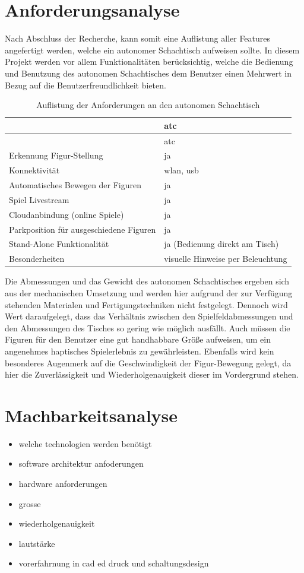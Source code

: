 \hypertarget{anforderungsanalyse}{%
\chapter{Anforderungsanalyse}\label{anforderungsanalyse}}

Nach Abschluss der Recherche, kann somit eine Auflistung aller Features
angefertigt werden, welche ein autonomer Schachtisch aufweisen sollte.
In diesem Projekt werden vor allem Funktionalitäten berücksichtig,
welche die Bedienung und Benutzung des autonomen Schachtisches dem
Benutzer einen Mehrwert in Bezug auf die Benutzerfreundlichkeit bieten.

\begin{longtable}[]{@{}ll@{}}
\caption{Auflistung der Anforderungen an den autonomen
Schachtisch}\tabularnewline
\toprule
& \gls{atc}\tabularnewline
\midrule
\endfirsthead
\toprule
& \gls{atc}\tabularnewline
\midrule
\endhead
Erkennung Figur-Stellung & ja\tabularnewline
Konnektivität & \gls{wlan}, \gls{usb}\tabularnewline
Automatisches Bewegen der Figuren & ja\tabularnewline
Spiel Livestream & ja\tabularnewline
Cloudanbindung (online Spiele) & ja\tabularnewline
Parkposition für ausgeschiedene Figuren & ja\tabularnewline
Stand-Alone Funktionalität & ja (Bedienung direkt am
Tisch)\tabularnewline
Besonderheiten & visuelle Hinweise per Beleuchtung\tabularnewline
\bottomrule
\end{longtable}

Die Abmessungen und das Gewicht des autonomen Schachtisches ergeben sich
aus der mechanischen Umsetzung und werden hier aufgrund der zur
Verfügung stehenden Materialen und Fertigungstechniken nicht festgelegt.
Dennoch wird Wert daraufgelegt, dass das Verhältnis zwischen den
Spielfeldabmessungen und den Abmessungen des Tisches so gering wie
möglich ausfällt. Auch müssen die Figuren für den Benutzer eine gut
handhabbare Größe aufweisen, um ein angenehmes haptisches Spielerlebnis
zu gewährleisten. Ebenfalls wird kein besonderes Augenmerk auf die
Geschwindigkeit der Figur-Bewegung gelegt, da hier die Zuverlässigkeit
und Wiederholgenauigkeit dieser im Vordergrund stehen.

\hypertarget{machbarkeitsanalyse}{%
\chapter{Machbarkeitsanalyse}\label{machbarkeitsanalyse}}

\begin{itemize}
\tightlist
\item
  welche technologien werden benötigt
\item
  software architektur anfoderungen
\item
  hardware anforderungen
\item
  grosse
\item
  wiederholgenauigkeit
\item
  lautstärke
\item
  vorerfahrnung in cad ed druck und schaltungsdesign
\end{itemize}

